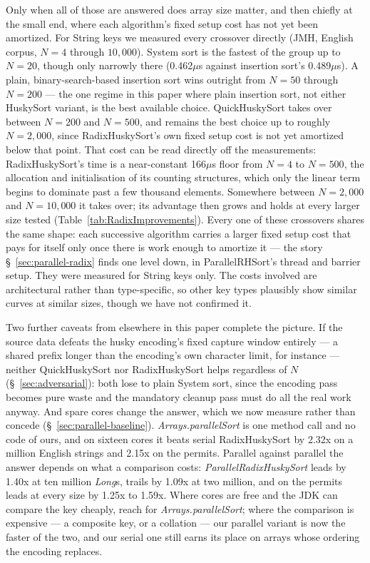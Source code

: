 \documentclass[twoside,leqno,twocolumn]{article}
\begin{document}
Only when all of those are answered does array size matter, and then chiefly at the small end,
where each algorithm's fixed setup cost has not yet been amortized.
For String keys we measured every crossover directly (JMH, English corpus, $N=4$ through $10{,}000$).
System sort is the fastest of the group up to $N=20$, though only narrowly there
(0.462$\mu$s against insertion sort's 0.489$\mu$s).
A plain, binary-search-based insertion sort wins outright from $N=50$ through $N=200$ —
the one regime in this paper where plain insertion sort,
not either HuskySort variant, is the best available choice.
QuickHuskySort takes over between $N=200$ and $N=500$, and remains the best choice up to roughly $N=2{,}000$,
since RadixHuskySort's own fixed setup cost is not yet amortized below that point.
That cost can be read directly off the measurements: RadixHuskySort's time is a near-constant
166$\mu$s floor from $N=4$ to $N=500$, the allocation and initialisation of its counting structures,
which only the linear term begins to dominate past a few thousand elements.
Somewhere between $N=2{,}000$ and $N=10{,}000$ it takes over;
its advantage then grows and holds at every larger size tested (Table~\ref{tab:RadixImprovements}).
Every one of these crossovers shares the same shape: each successive algorithm carries a larger fixed
setup cost that pays for itself only once there is work enough to amortize it —
the story \S~\ref{sec:parallel-radix} finds one level down, in ParallelRHSort's thread and barrier setup.
They were measured for String keys only.
The costs involved are architectural rather than type-specific, so other key types plausibly show
similar curves at similar sizes, though we have not confirmed it.

Two further caveats from elsewhere in this paper complete the picture.
If the source data defeats the husky encoding's fixed capture window entirely —
a shared prefix longer than the encoding's own character limit, for instance —
neither QuickHuskySort nor RadixHuskySort helps regardless of $N$ (\S~\ref{sec:adversarial}):
both lose to plain System sort, since the encoding pass becomes pure waste and the mandatory cleanup pass must do all the real work anyway.
And spare cores change the answer, which we now measure rather than concede
(\S~\ref{sec:parallel-baseline}).
\mbox{\textit{Arrays.parallelSort}} is one method call and no code of ours, and on sixteen cores it beats
serial RadixHuskySort by 2.32x on a million English strings and 2.15x on the permits.
Parallel against parallel the answer depends on what a comparison costs:
\textit{ParallelRadixHuskySort} leads by 1.40x at ten million \textit{Long}s, trails by 1.09x at two
million, and on the permits leads at every size by 1.25x to 1.59x.
Where cores are free and the JDK can compare the key cheaply, reach for
\mbox{\textit{Arrays.parallelSort}}; where the comparison is expensive --- a composite key, or a
collation --- our parallel variant is now the faster of the two, and our serial one still earns its
place on arrays whose ordering the encoding replaces.
\end{document}
